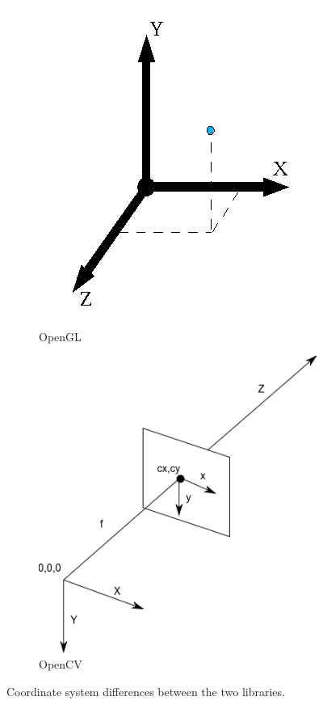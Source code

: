 \documentclass[]{article}
\begin{document}
\begin{itemize}
\begin{figure}[!hbtp]
\centering
\begin{subfigure}{.5\textwidth}
  \centering
  \includegraphics[width=0.9\linewidth]{figures/OpenGLCoords.jpg}
  \caption{OpenGL}
  \label{fig:OpenGLCoordinateSystem}
\end{subfigure}%
\begin{subfigure}{.5\textwidth}
  \centering
  \includegraphics[width=0.9\linewidth]{figures/OpenCVCoords.png}
  \caption{OpenCV}
  \label{fig:OpenCVCoordinateSystem}
\end{subfigure}
\caption{Coordinate system differences between the two libraries.}
\label{fig:OpenCVOpenGLCoords}
\end{figure}


\end{itemize}
\end{document}
